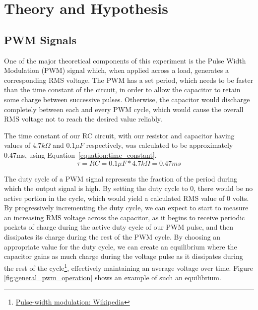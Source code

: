 \section{Theory and Hypothesis}
\label{section:theory_and_hypothesis}


\subsection{PWM Signals}
One of the major theoretical components of this experiment is the Pulse Width Modulation (PWM) signal which, when applied across a load, generates a corresponding RMS voltage. The PWM has a set period, which needs to be faster than the time constant of the circuit, in order to allow the capacitor to retain some charge between successive pulses. Otherwise, the capacitor would discharge completely between each and every PWM cycle, which would cause the overall RMS voltage not to reach the desired value reliably.



The time constant of our RC circuit, with our resistor and capacitor having values of $4.7k\Omega$ and $0.1\mu F$ respectively, was calculated to be approximately 0.47ms, using Equation~\ref{equation:time_constant}. 
\begin{equation}
\tau = RC = 0.1{\mu}F * 4.7k\Omega = 0.47 ms
\label{equation:time_constant}
\end{equation}



The duty cycle of a PWM signal represents the fraction of the period during which the output signal is high. By setting the duty cycle to 0, there would be no active portion in the cycle, which would yield a calculated RMS value of 0 volts. By progressively incrementing the duty cycle, we can expect to start to measure an increasing RMS voltage across the capacitor, as it begins to receive periodic packets of charge during the active duty cycle of our PWM pulse, and then dissipates its charge during the rest of the PWM cycle. By choosing an appropriate value for the duty cycle, we can create an equilibrium where the capacitor gains as much charge during the voltage pulse as it dissipates during the rest of the cycle\footnote{\href{https://en.wikipedia.org/wiki/Pulse-width_modulation}{Pulse-width modulation: Wikipedia}}, effectively maintaining an average voltage over time. Figure \ref{fig:general_pwm_operation} shows an example of such an equilibrium. 


\newcommand*{\captionsource}[2]{%
  \caption[{#1}]{%
    #1%
    \\\hspace{\linewidth}%
    \textbf{Source:} #2%
  }%
}



